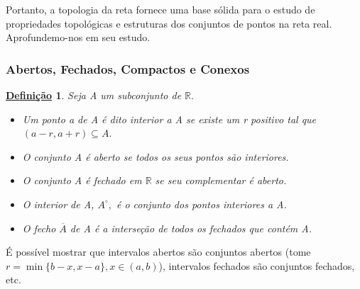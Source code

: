 \documentclass{article}
\newtheorem*{def*}{\underline{Defini\c c\~ao}}
\begin{document}
Portanto, a topologia da reta fornece uma base sólida para o estudo de propriedades topológicas e estruturas dos conjuntos de pontos na reta real. Aprofundemo-nos
em seu estudo.
\subsubsection{Abertos, Fechados, Compactos e Conexos}
\begin{def*}
  Seja A um subconjunto de $\mathbb{R}.$
 \begin{itemize}
   \item[1)] Um ponto a de A \'e dito interior a A se existe um r positivo tal que $(a-r, a+r)\subseteq{A}.$
   \item[2)] O conjunto A \'e aberto se todos os seus pontos s\~ao interiores.
   \item[3)] O conjunto A \'e fechado em $\mathbb{R}$ se seu complementar \'e aberto.
   \item[4)] O interior de A, $A^{\circ},$ \'e o conjunto dos pontos interiores a A.
   \item[5)] O fecho $\overline{A}$ de A \'e a interse\c c\~ao de todos os fechados que cont\'em A.
 \end{itemize}
\end{def*}
\'E poss\'ivel mostrar que intervalos abertos s\~ao conjuntos abertos (tome $r=\min{\{b-x, x-a\}}, x\in(a, b)$), intervalos fechados s\~ao conjuntos fechados, etc. 
\end{document}
